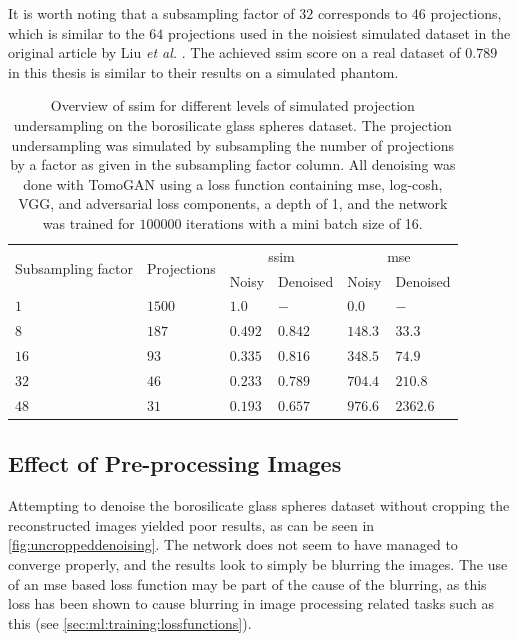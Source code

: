 It is worth noting that a subsampling factor of $32$ corresponds to $46$ projections, which is similar to the $64$ projections used in the noisiest simulated dataset in the original article by Liu \textit{et al.} \cite{liu2020tomogan}. The achieved \gls{ssim} score on a real dataset of $0.789$ in this thesis is similar to their results on a simulated phantom. 

\begin{table}[htbp]
  \centering
  \caption[SSIM for different levels of simulated projection undersampling and corresponding values after denoising]{Overview of \gls{ssim} for different levels of simulated projection undersampling on the borosilicate glass spheres dataset. The projection undersampling was simulated by subsampling the number of projections by a factor as given in the subsampling factor column. All denoising was done with TomoGAN using a loss function containing \gls{mse}, log-cosh, VGG, and adversarial loss components, a depth of 1, and the network was trained for $100 000$ iterations with a mini batch size of 16. }
  \label{tab:missingwedgessim}
  \begin{tabular}{llllll}
  \hline
  \multirow{2}{*}{Subsampling factor} & \multirow{2}{*}{Projections} & \multicolumn{2}{c}{\gls{ssim}} & \multicolumn{2}{c}{\gls{mse}}  \\
  {} & {} & Noisy & Denoised & Noisy & Denoised \\
  \hhline{======}
  $1$  & $1500$ & $1.0$ & $-$ & $0.0$ & $-$ \\
  $8$  & $187$ & $0.492$ & $0.842$ & $148.3$ & $33.3$ \\
  $16$ & $93$ & $0.335$ & $0.816$ & $348.5$ & $74.9$ \\
  $32$ & $46$ & $0.233$ & $0.789$ & $704.4$ & $210.8$ \\
  $48$ & $31$ & $0.193$ & $0.657$ & $976.6$ & $2362.6$ \\
  \hline
  \end{tabular}
\end{table}

\subsection{Effect of Pre-processing Images}
Attempting to denoise the borosilicate glass spheres dataset without cropping the reconstructed images yielded poor results, as can be seen in \cref{fig:uncroppeddenoising}. The network does not seem to have managed to converge properly, and the results look to simply be blurring the images. The use of an \gls{mse} based loss function may be part of the cause of the blurring, as this loss has been shown to cause blurring in image processing related tasks such as this (see \cref{sec:ml:training:lossfunctions}). 

